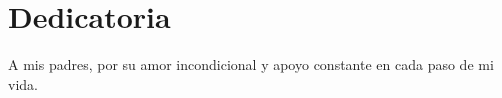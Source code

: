 \chapter*{Dedicatoria}

A mis padres, por su amor incondicional y apoyo constante en cada paso de mi vida.
